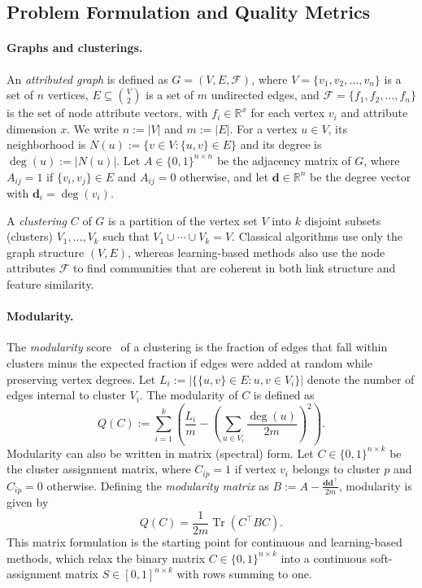 \documentclass[11pt,a4paper]{article}
\begin{document}
\subsection{Problem Formulation and Quality Metrics}\label{sec:preliminary}

\paragraph*{\textbf{Graphs and clusterings.}}
An \emph{attributed graph} is defined as $G = (V, E, \mathcal{F})$, where $V = \{v_1, v_2, \dots, v_n\}$ is a set of $n$ vertices, $E \subseteq \binom{V}{2}$ is a set of $m$ undirected edges, and $\mathcal{F} = \{f_1, f_2, \dots, f_n\}$ is the set of node attribute vectors, with $f_i \in \mathbb{R}^x$ for each vertex $v_i$ and attribute dimension $x$. We write $n := |V|$ and $m := |E|$. For a vertex $u \in V$, its neighborhood is $N(u) := \{v \in V : \{u,v\} \in E\}$ and its degree is $\deg(u) := |N(u)|$. Let $A \in \{0,1\}^{n \times n}$ be the adjacency matrix of $G$, where $A_{ij} = 1$ if $\{v_i,v_j\} \in E$ and $A_{ij} = 0$ otherwise, and let $\mathbf{d} \in \mathbb{R}^n$ be the degree vector with $\mathbf{d}_i = \deg(v_i)$.

A \emph{clustering} $C$ of $G$ is a partition of the vertex set $V$ into $k$ disjoint subsets (clusters) $V_1, \dots, V_k$ such that $V_1 \cup \cdots \cup V_k = V$. Classical algorithms use only the graph structure $(V,E)$, whereas learning-based methods also use the node attributes $\mathcal{F}$ to find communities that are coherent in both link structure and feature similarity.

\paragraph*{\textbf{Modularity.}}
The \emph{modularity} score~\cite{girvan2002,Newman2006} of a clustering is the fraction of edges that fall within clusters minus the expected fraction if edges were added at random while preserving vertex degrees. Let $L_i := |\{\{u,v\} \in E : u,v \in V_i\}|$ denote the number of edges internal to cluster $V_i$. The modularity of $C$ is defined as
\[Q(C) := \sum_{i = 1}^{k}{\left(\frac{L_i}{m} - \left(\sum_{u \in V_i}{\frac{\deg(u)}{2m}}\right)^2 \right)}. \]
Modularity can also be written in matrix (spectral) form. Let $C \in \{0,1\}^{n \times k}$ be the cluster assignment matrix, where $C_{ip} = 1$ if vertex $v_i$ belongs to cluster $p$ and $C_{ip} = 0$ otherwise. Defining the \emph{modularity matrix} as $B := A - \frac{\mathbf{d}\mathbf{d}^\top}{2m}$, modularity is given by
\[ Q(C) = \frac{1}{2m} \operatorname{Tr}(C^\top B C). \]
This matrix formulation is the starting point for continuous and learning-based methods, which relax the binary matrix $C \in \{0,1\}^{n \times k}$ into a continuous soft-assignment matrix $S \in [0,1]^{n \times k}$ with rows summing to one.
\end{document}
